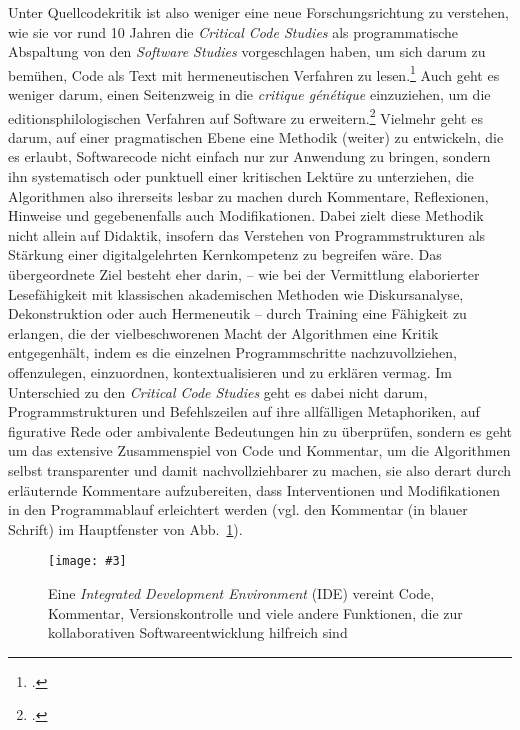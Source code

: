 \documentclass[a4paper,11pt]{article}
\newcommand{\pngbild}[4]{\texttt{[image: \#3]}}
\begin{document}
Unter Quellcodekritik ist also weniger eine neue Forschungsrichtung zu verstehen, wie sie vor rund 10 Jahren die \emph{Critical Code Studies}  als programmatische Abspaltung von den \emph{Software Studies} vorgeschlagen haben, um sich darum zu bemühen, Code als Text mit hermeneutischen Verfahren zu lesen.\footcite[Vgl.][]{marino:2006,marino:2010} Auch geht es weniger darum, einen Seitenzweig in die \emph{critique génétique} einzuziehen, um die editionsphilologischen Verfahren auf Software zu erweitern.\footcites[Zu letzterem siehe erste Ansätze bei][]{hiller:2014}[zur Editionsphilologie und \emph{critique génétique} allgemein][]{gresillon:1999} Vielmehr geht es darum, auf einer pragmatischen Ebene eine Methodik (weiter) zu entwickeln, die es erlaubt, Softwarecode nicht einfach nur zur Anwendung zu bringen, sondern ihn systematisch oder punktuell einer kritischen Lektüre zu unterziehen, die Algorithmen also ihrerseits lesbar zu machen durch Kommentare, Reflexionen, Hinweise und gegebenenfalls auch Modifikationen. Dabei zielt diese Methodik nicht allein auf Didaktik, insofern das Verstehen von Programmstrukturen als Stärkung einer digitalgelehrten Kernkompetenz zu begreifen wäre. Das übergeordnete Ziel besteht eher darin, – wie bei der Vermittlung elaborierter Lesefähigkeit mit klassischen akademischen Methoden wie Diskursanalyse, Dekonstruktion oder auch Hermeneutik – durch Training eine Fähigkeit zu erlangen, die der vielbeschworenen Macht der Algorithmen eine Kritik entgegenhält, indem es die einzelnen Programmschritte nachzuvollziehen, offenzulegen, einzuordnen, kontextualisieren und zu erklären vermag. Im Unterschied zu den  \emph{Critical Code Studies} geht es dabei nicht darum, Programmstrukturen und Befehlszeilen auf ihre allfälligen Metaphoriken, auf figurative Rede oder ambivalente Bedeutungen hin zu überprüfen, sondern es geht um das extensive Zusammenspiel von Code und Kommentar, um die Algorithmen selbst transparenter und damit nachvollziehbarer zu machen, sie also derart durch erläuternde Kommentare aufzubereiten, dass Interventionen und Modifikationen in den Programmablauf erleichtert werden (vgl. den Kommentar (in blauer Schrift) im Hauptfenster von Abb.~\ref{abb:ide}). 

\begin{figure}[ht]
\begin{center}
\pngbild{1440}{900}{../bilder/IDE.png}{1.16\textwidth}\\[-3mm]
\caption{Eine \emph{Integrated Development Environment} (IDE) vereint Code, Kommentar, Versionskontrolle und viele andere Funktionen, die zur kollaborativen Softwareentwicklung hilfreich sind}\label{abb:ide}
\end{center}
\end{figure}
\end{document}
